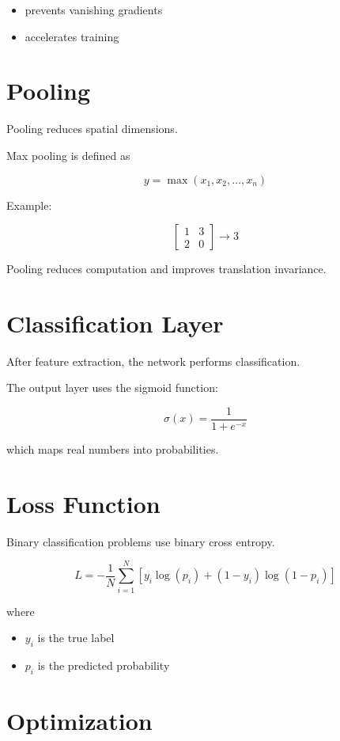 ﻿\documentclass[11pt]{article}
\begin{document}
\begin{itemize}
\item prevents vanishing gradients
\item accelerates training
\end{itemize}

\section{Pooling}

Pooling reduces spatial dimensions.

Max pooling is defined as

\[
y = \max(x_1,x_2,\dots,x_n)
\]

Example:

\[
\begin{bmatrix}
1 & 3 \\
2 & 0
\end{bmatrix}
\rightarrow 3
\]

Pooling reduces computation and improves translation invariance.

\section{Classification Layer}

After feature extraction, the network performs classification.

The output layer uses the sigmoid function:

\[
\sigma(x) = \frac{1}{1 + e^{-x}}
\]

which maps real numbers into probabilities.

\section{Loss Function}

Binary classification problems use binary cross entropy.

\[
L = -\frac{1}{N}
\sum_{i=1}^{N}
\left[
y_i \log(p_i)
+
(1-y_i)\log(1-p_i)
\right]
\]

where

\begin{itemize}
\item $y_i$ is the true label
\item $p_i$ is the predicted probability
\end{itemize}

\section{Optimization}
\end{document}
